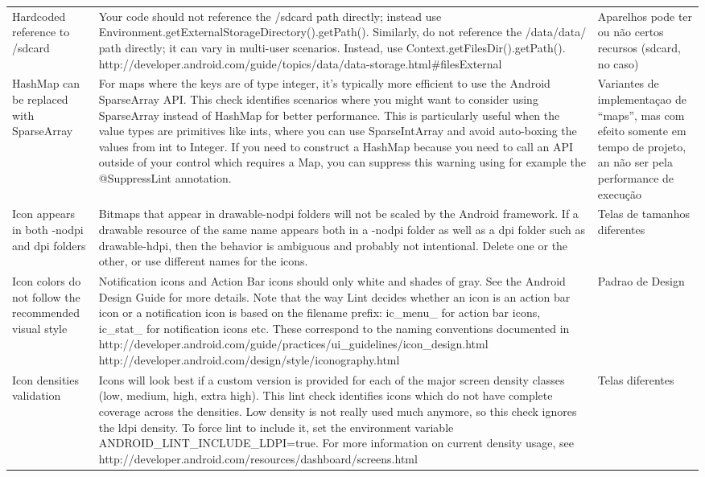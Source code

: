\begin{landscape}
\begin{longtable}{p{30mm}|p{180mm}|p{25mm}}
Hardcoded reference to /sdcard
&Your code should not reference the /sdcard path directly; instead use Environment.getExternalStorageDirectory().getPath(). Similarly, do not reference the /data/data/ path directly; it can vary in multi-user scenarios. Instead, use Context.getFilesDir().getPath(). http://developer.android.com/guide/topics/data/data-storage.html\#filesExternal
&Aparelhos pode ter ou não certos recursos (sdcard, no caso)\\

HashMap can be replaced with SparseArray
&For maps where the keys are of type integer, it's typically more efficient to use the Android SparseArray API. This check identifies scenarios where you might want to consider using SparseArray instead of HashMap for better performance. This is particularly useful when the value types are primitives like ints, where you can use SparseIntArray and avoid auto-boxing the values from int to Integer. If you need to construct a HashMap because you need to call an API outside of your control which requires a Map, you can suppress this warning using for example the @SuppressLint annotation.
&Variantes de implementaçao de “maps”, mas com efeito somente em tempo de projeto, an não ser pela performance de execução\\

Icon appears in both -nodpi and dpi folders
&Bitmaps that appear in drawable-nodpi folders will not be scaled by the Android framework. If a drawable resource of the same name appears both in a -nodpi folder as well as a dpi folder such as drawable-hdpi, then the behavior is ambiguous and probably not intentional. Delete one or the other, or use different names for the icons.
&Telas de tamanhos diferentes\\

Icon colors do not follow the recommended visual style
&Notification icons and Action Bar icons should only white and shades of gray. See the Android Design Guide for more details. Note that the way Lint decides whether an icon is an action bar icon or a notification icon is based on the filename prefix: ic\_menu\_ for action bar icons, ic\_stat\_ for notification icons etc. These correspond to the naming conventions documented in http://developer.android.com/guide/practices/ui\_guidelines/icon\_design.html http://developer.android.com/design/style/iconography.html
&Padrao de Design\\

Icon densities validation
&Icons will look best if a custom version is provided for each of the major screen density classes (low, medium, high, extra high). This lint check identifies icons which do not have complete coverage across the densities. Low density is not really used much anymore, so this check ignores the ldpi density. To force lint to include it, set the environment variable ANDROID\_LINT\_INCLUDE\_LDPI=true. For more information on current density usage, see http://developer.android.com/resources/dashboard/screens.html
&Telas diferentes\\


\end{longtable}
\end{landscape}
